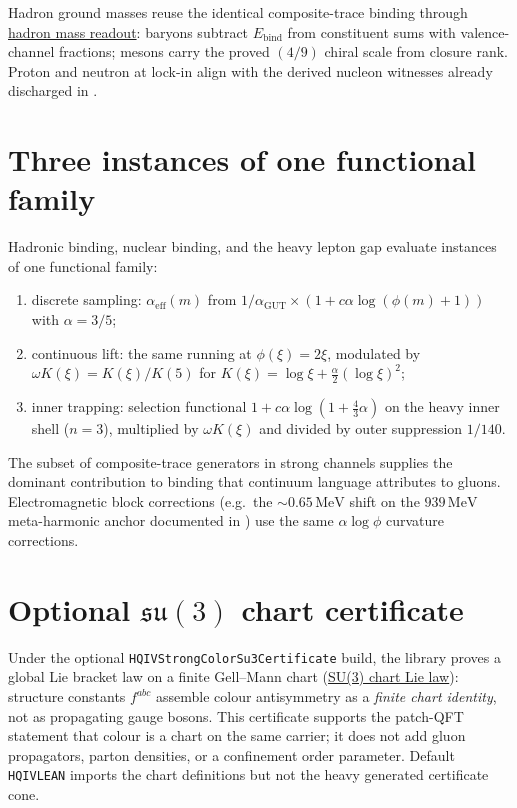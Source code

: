 \documentclass[11pt]{amsart}
\newcommand{\leanterm}[2]{\hyperref[#1]{#2}}
\begin{document}
Hadron ground masses reuse the identical composite-trace binding through
\leanterm{lean:hadron-readout}{hadron mass readout}: baryons subtract
$E_{\mathrm{bind}}$ from constituent sums with valence-channel fractions; mesons
carry the proved $(4/9)$ chiral scale from closure rank. Proton and neutron at
lock-in align with the derived nucleon witnesses already discharged in
\cite{hqiv-nucleon-binding-paper}.

\section{Three instances of one functional family}
\label{sec:three-instances}

Hadronic binding, nuclear binding, and the heavy lepton gap evaluate instances of
one functional family:
\begin{enumerate}[label=(\roman*),nosep]
\item discrete sampling: $\alpha_{\mathrm{eff}}(m)$ from
$1/\alpha_{\mathrm{GUT}}\times(1+c\alpha\log(\phi(m)+1))$ with $\alpha=3/5$;
\item continuous lift: the same running at $\phi(\xi)=2\xi$, modulated by
$\omega K(\xi)=K(\xi)/K(5)$ for $K(\xi)=\log\xi+\frac{\alpha}{2}(\log\xi)^2$;
\item inner trapping: selection functional
$1+c\alpha\log(1+\frac{4}{3}\alpha)$ on the heavy inner shell ($n=3$), multiplied
by $\omega K(\xi)$ and divided by outer suppression $1/140$.
\end{enumerate}
The subset of composite-trace generators in strong channels supplies the dominant
contribution to binding that continuum language attributes to gluons. Electromagnetic
block corrections (e.g.\ the $\sim 0.65\,\mathrm{MeV}$ shift on the
$939\,\mathrm{MeV}$ meta-harmonic anchor documented in
\cite{hqiv-nucleon-binding-paper}) use the same $\alpha\log\phi$ curvature
corrections.

\section{Optional $\mathfrak{su}(3)$ chart certificate}
\label{sec:chart-cert}

Under the optional \texttt{HQIVStrongColorSu3Certificate} build, the library proves
a global Lie bracket law on a finite Gell--Mann chart
(\hyperref[lean:su3-chart-law]{SU(3) chart Lie law}): structure constants
$f^{abc}$ assemble colour antisymmetry as a \emph{finite chart identity}, not as
propagating gauge bosons. This certificate supports the patch-QFT statement that
colour is a chart on the same carrier; it does not add gluon propagators, parton
densities, or a confinement order parameter. Default \texttt{HQIVLEAN} imports the
chart definitions but not the heavy generated certificate cone.
\end{document}
